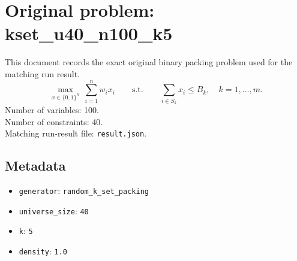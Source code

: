 \documentclass[11pt]{article}
\begin{document}
\section*{Original problem: kset\_u40\_n100\_k5}
This document records the exact original binary packing problem used for the matching run result.
\[
\max_{x\in\{0,1\}^n}\ \sum_{i=1}^n w_i x_i
\qquad\text{s.t.}\qquad
\sum_{i\in S_k} x_i \le B_k,\quad k=1,\dots,m.
\]
Number of variables: 100.\\
Number of constraints: 40.\\
Matching run-result file: \texttt{result.json}.
\subsection*{Metadata}
\begin{itemize}
\item \texttt{generator}: \texttt{random\_k\_set\_packing}
\item \texttt{universe\_size}: \texttt{40}
\item \texttt{k}: \texttt{5}
\item \texttt{density}: \texttt{1.0}
\end{itemize}
\end{document}
